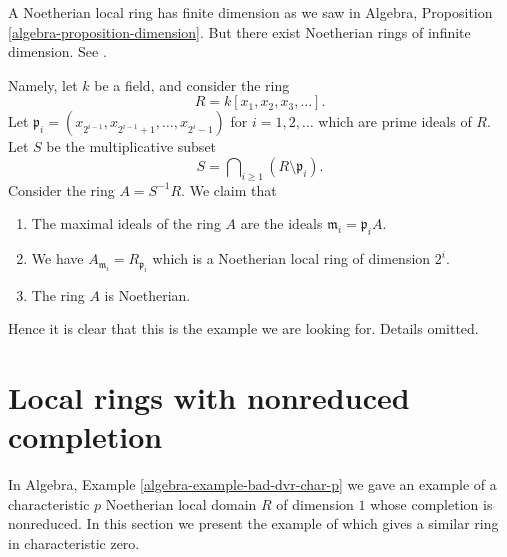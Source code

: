\noindent
A Noetherian local ring has finite dimension as we saw in
Algebra, Proposition \ref{algebra-proposition-dimension}.
But there exist Noetherian rings of infinite dimension.
See \cite[Appendix, Example 1]{Nagata}.

\medskip\noindent
Namely, let $k$ be a field, and consider the ring
$$
R = k[x_1, x_2, x_3, \ldots ].
$$
Let $\mathfrak p_i = (x_{2^{i - 1}}, x_{2^{i - 1} + 1}, \ldots, x_{2^i - 1})$
for $i = 1, 2, \ldots$ which are prime ideals of $R$. Let $S$
be the multiplicative subset
$$
S = \bigcap\nolimits_{i \geq 1} (R \setminus \mathfrak p_i).
$$
Consider the ring $A = S^{-1}R$.
We claim that
\begin{enumerate}
\item The maximal ideals of the ring $A$ are the ideals
$\mathfrak m_i = \mathfrak p_iA$.
\item We have $A_{\mathfrak m_i} = R_{\mathfrak p_i}$ which is
a Noetherian local ring of dimension $2^i$.
\item The ring $A$ is Noetherian.
\end{enumerate}
Hence it is clear that this is the example we are looking for.
Details omitted.




\section{Local rings with nonreduced completion}
\label{section-local-completion-nonreduced}

\noindent
In Algebra, Example \ref{algebra-example-bad-dvr-char-p} we gave an example
of a characteristic $p$ Noetherian local domain $R$ of dimension $1$
whose completion is nonreduced. In this section we present the example
of \cite[Proposition 3.1]{Ferrand-Raynaud} which gives a similar
ring in characteristic zero.


